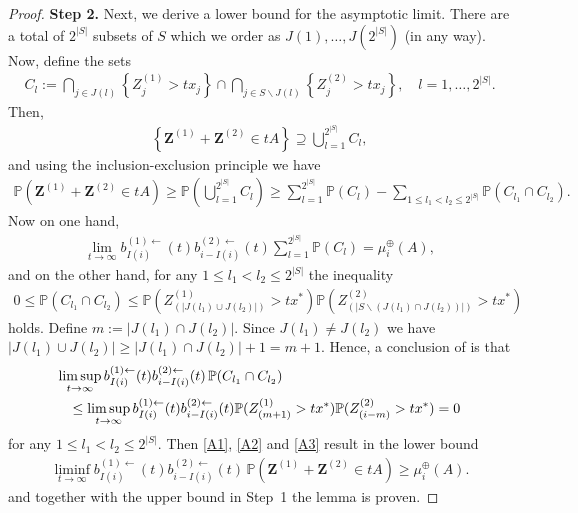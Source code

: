 \documentclass[aos]{imsart}
\numberwithin{equation}{section}
\theoremstyle{plain} %
\theoremstyle{remark}
\newcommand{\beao}{\begin{eqnarray*}}
\newcommand{\eeao}{\end{eqnarray*}\noindent}
\newcommand{\beam}{\begin{eqnarray}}
\newcommand{\eeam}{\end{eqnarray}\noindent}
\newcommand{\E}{\mathbb{E}}
\renewcommand\P{\mathbb{P}}
\def\bZ{\boldsymbol Z}
\def\bz{\boldsymbol z}
\begin{document}
\begin{proof}
 \textbf{Step 2.} Next, we derive a lower bound for the asymptotic limit.
There are a total of $2^{|S|}$ subsets of $S$ which we order as
$J(1),\ldots, J(2^{|S|})$ (in any way). Now, define the sets
\beao
    C_{l}:=\bigcap_{j\in J(l)}\left\{Z_j^{(1)}> t x_j\right\}\cap \bigcap_{j\in S\backslash J(l)}\left\{Z_j^{(2)}> t x_j\right\}, \quad
        l=1,\ldots,2^{|S|}.
\eeao
Then,
\beao
    \left\{\bZ^{(1)}+\bZ^{(2)}\in tA\right\}\supseteq\bigcup_{l=1}^{2^{|S|}}C_l,
\eeao
and using the inclusion-exclusion principle we have
\beam \label{A1}
    \P\left(\bZ^{(1)}+\bZ^{(2)}\in tA\right)\geq \P\left(\bigcup_{l=1}^{2^{|S|}}C_l\right)%
        \geq \sum_{l=1}^{2^{|S|}}\P(C_l)-\sum_{1\leq l_1<l_2\leq 2^{|S|}}\P(C_{l_1}\cap C_{l_2}).
\eeam
Now on one hand,
\beam \label{A2}
    \lim_{t\to\infty}b_{I(i)}^{(1)\leftarrow}(t)b_{i-I(i)}^{(2)\leftarrow}(t)\sum_{l=1}^{2^{|S|}}\P(C_l)=\mu_i^{\oplus}(A),
\eeam
and on the other hand, for any $1\leq l_1<l_2\leq 2^{|S|}$ the inequality
\beao
    0\leq \P(C_{l_1}\cap C_{l_2})\leq \P(Z_{(|J(l_1)\cup J(l_2)|)}^{(1)}>t x^*)\P(Z_{(|S\backslash (J(l_1)\cap J(l_2))|) }^{(2)}>tx^*)
\eeao
holds.  Define $m:=|J(l_1)\cap J(l_2)|$. Since $J(l_1)\not=J(l_2)$ we have $|J(l_1)\cup J(l_2)|\geq |J(l_1)\cap J(l_2)|+1=m+1$.
Hence, a conclusion of  is that
\beam \label{A3}
    \lefteqn{\limsup_{t\to\infty}b_{I(i)}^{(1)\leftarrow}(t)b_{i-I(i)}^{(2)\leftarrow}(t)\,\P(C_{l_1}\cap C_{l_2})}  \\
        &&\leq \limsup_{t\to\infty}b_{I(i)}^{(1)\leftarrow}(t)b_{i-I(i)}^{(2)\leftarrow}(t)
         \P(Z_{(m+1)}^{(1)}>t x^*)\P(Z_{(i-m) }^{(2)}>tx^*) =0 \nonumber
\eeam
for any $1\leq l_1<l_2\leq 2^{|S|}$. Then \eqref{A1}, \eqref{A2} and \eqref{A3} result in the lower bound
\beao
    \liminf_{t\to\infty}b_{I(i)}^{(1)\leftarrow}(t)b_{i-I(i)}^{(2)\leftarrow}(t)\,\P\left(\bZ^{(1)}+\bZ^{(2)}\in tA\right)
    \geq \mu_i^{\oplus}(A).%
\eeao
and together with the upper bound in Step~1 the lemma is proven.
\end{proof}
\end{document}
